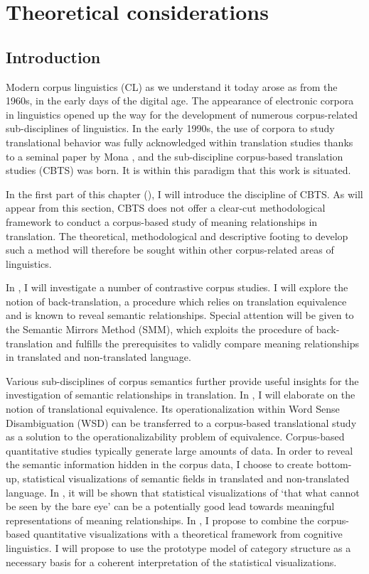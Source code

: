 \chapter{Theoretical considerations}
\label{sec:2}

\section{Introduction}
\label{sec:2.1}  
Modern corpus linguistics (CL) as we understand it today arose as from the 1960s, in the early days of the digital age. The appearance of electronic corpora in linguistics opened up the way for the development of numerous corpus-related sub-disciplines of linguistics. In the early 1990s, the use of corpora to study translational behavior was fully acknowledged within translation studies thanks to a seminal paper by Mona \citet{baker_corpus_1993}, and the sub-discipline corpus-based translation studies (CBTS) was born. It is within this paradigm that this work is situated.

In the first part of this chapter (), I will introduce the discipline of CBTS. As will appear from this section, CBTS does not offer a clear-cut methodological framework to conduct a corpus-based study of meaning relationships in translation. The theoretical, methodological and descriptive footing to develop such a method will therefore be sought within other corpus-related areas of linguistics.

In , I will investigate a number of contrastive corpus studies. I will explore the notion of back-translation, a procedure which relies on translation equivalence and is known to reveal semantic relationships. Special attention will be given to the Semantic Mirrors Method (SMM), which exploits the procedure of back-translation and fulfills the prerequisites to validly compare meaning relationships in translated and non-translated language.

Various sub-disciplines of corpus semantics further provide useful insights for the investigation of semantic relationships in translation. In , I will elaborate on the notion of translational equivalence. Its operationalization within Word Sense Disambiguation (WSD) can be transferred to a corpus-based translational study as a solution to the operationalizability problem of equivalence. Corpus-based quantitative studies typically generate large amounts of data. In order to reveal the semantic information hidden in the corpus data, I choose to create bottom-up, statistical visualizations of semantic fields in translated and non-translated language. In , it will be shown that statistical visualizations of ‘that what cannot be seen by the bare eye’ can be a potentially good lead towards meaningful representations of meaning relationships. In , I propose to combine the corpus-based quantitative visualizations with a theoretical framework from cognitive linguistics. I will propose to use the prototype model of category structure as a necessary basis for a coherent interpretation of the statistical visualizations.

